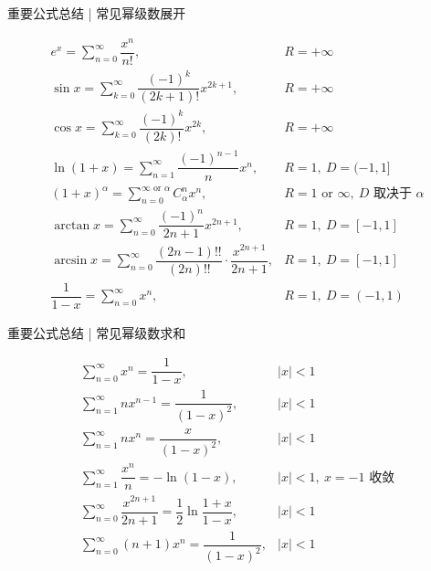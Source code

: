 \begin{frame}{重要公式总结 | 常见幂级数展开}

{\smaller[1]
\[
\begin{array}{ll}
e^x = \displaystyle\sum_{n=0}^\infty \dfrac{x^n}{n!}, & R = +\infty \\[1.2em]
\sin x = \displaystyle\sum_{k=0}^\infty \dfrac{(-1)^k}{(2k+1)!} x^{2k+1}, & R = +\infty \\[1.2em]
\cos x = \displaystyle\sum_{k=0}^\infty \dfrac{(-1)^k}{(2k)!} x^{2k}, & R = +\infty \\[1.2em]
\ln(1+x) = \displaystyle\sum_{n=1}^\infty \dfrac{(-1)^{n-1}}{n} x^n, & R = 1,\ D = (-1, 1] \\[1.2em]
(1+x)^\alpha = \displaystyle\sum_{n=0}^{\infty \text{ or } \alpha} C_\alpha^n x^n, & R = 1 \text{ or } \infty,\ D \text{ 取决于 } \alpha \\[1.2em]
\arctan x = \displaystyle\sum_{n=0}^\infty \dfrac{(-1)^n}{2n+1} x^{2n+1}, & R = 1,\ D = [-1, 1] \\[1.2em]
\arcsin x = \displaystyle\sum_{n=0}^\infty \dfrac{(2n-1)!!}{(2n)!!} \cdot \dfrac{x^{2n+1}}{2n+1}, & R = 1,\ D = [-1, 1] \\[1.2em]
\dfrac{1}{1-x} = \displaystyle\sum_{n=0}^\infty x^n, & R = 1,\ D = (-1, 1)
\end{array}
\]
}

\end{frame}


\begin{frame}{重要公式总结 | 常见幂级数求和}

\[
\begin{array}{ll}
\displaystyle\sum_{n=0}^\infty x^n = \dfrac{1}{1-x}, & |x| < 1 \\[1.5em]
\displaystyle\sum_{n=1}^\infty n x^{n-1} = \dfrac{1}{(1-x)^2}, & |x| < 1 \\[1.5em]
\displaystyle\sum_{n=1}^\infty n x^n = \dfrac{x}{(1-x)^2}, & |x| < 1 \\[1.5em]
\displaystyle\sum_{n=1}^\infty \dfrac{x^n}{n} = -\ln(1-x), & |x| < 1,\ x = -1 \text{ 收敛} \\[1.5em]
\displaystyle\sum_{n=0}^\infty \dfrac{x^{2n+1}}{2n+1} = \dfrac{1}{2} \ln \dfrac{1+x}{1-x}, & |x| < 1 \\[1.5em]
\displaystyle\sum_{n=0}^\infty (n+1) x^n = \dfrac{1}{(1-x)^2}, & |x| < 1
\end{array}
\]

\end{frame}

